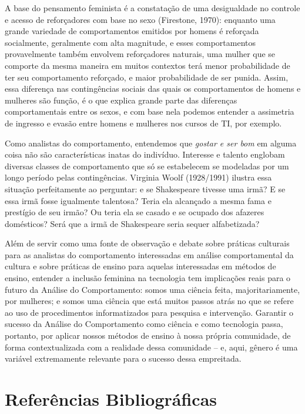 A base do pensamento feminista é a constatação de uma desigualdade no controle e acesso de reforçadores com base no sexo (Firestone, 1970): enquanto uma grande variedade de comportamentos emitidos por homens é reforçada socialmente, geralmente com alta magnitude, e esses comportamentos provavelmente também envolvem reforçadores naturais, uma mulher que se comporte da mesma maneira em muitos contextos terá menor probabilidade de ter seu comportamento reforçado, e maior probabilidade de ser punida. Assim, essa diferença nas contingências sociais das quais os comportamentos de homens e mulheres são função, é o que explica grande parte das diferenças comportamentais entre os sexos, e com base nela podemos entender a assimetria de ingresso e evasão entre homens e mulheres nos cursos de TI, por exemplo. 

Como analistas do comportamento, entendemos que \textit{gostar e ser bom} em alguma coisa não são características inatas do indivíduo. Interesse e talento englobam diversas classes de comportamento que só se estabelecem se modeladas por um longo período pelas contingências. Virginia Woolf (1928/1991) ilustra essa situação perfeitamente ao perguntar: e se Shakespeare tivesse uma irmã? E se essa irmã fosse igualmente talentosa? Teria ela alcançado a mesma fama e prestígio de seu irmão? Ou teria ela se casado e se ocupado dos afazeres domésticos? Será que a irmã de Shakespeare seria sequer alfabetizada?

Além de servir como uma fonte de observação e debate sobre práticas culturais para as analistas do comportamento interessadas em análise comportamental da cultura e sobre práticas de ensino para aquelas interessadas em métodos de ensino, entender a inclusão feminina na tecnologia tem implicações reais para o futuro da Análise do Comportamento: somos uma ciência feita, majoritariamente, por mulheres; e somos uma ciência que está muitos passos atrás no que se refere ao uso de procedimentos informatizados para pesquisa e intervenção. Garantir o sucesso da Análise do Comportamento como ciência e como tecnologia passa, portanto, por aplicar nossos métodos de ensino à nossa própria comunidade, de forma contextualizada com a realidade dessa comunidade – e, aqui, gênero é uma variável extremamente relevante para o sucesso dessa empreitada. 

\section*{Referências Bibliográficas}

